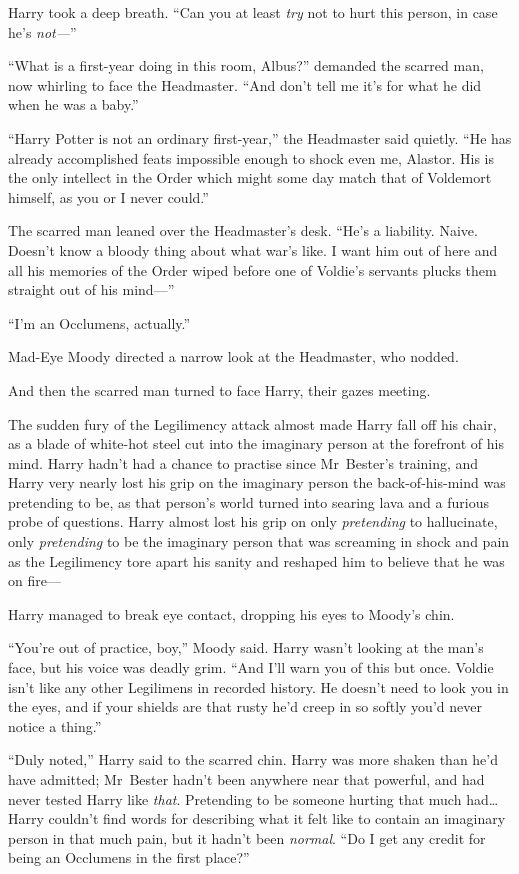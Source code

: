 Harry took a deep breath. “Can you at least \emph{try} not to hurt this person, in case he’s \emph{not—}”

“What is a first-year doing in this room, Albus?” demanded the scarred man, now whirling to face the Headmaster. “And don’t tell me it’s for what he did when he was a baby.”

“Harry Potter is not an ordinary first-year,” the Headmaster said quietly. “He has already accomplished feats impossible enough to shock even me, Alastor. His is the only intellect in the Order which might some day match that of Voldemort himself, as you or I never could.”

The scarred man leaned over the Headmaster’s desk. “He’s a liability. Naive. Doesn’t know a bloody thing about what war’s like. I want him out of here and all his memories of the Order wiped before one of Voldie’s servants plucks them straight out of his mind—”

“I’m an Occlumens, actually.”

Mad-Eye Moody directed a narrow look at the Headmaster, who nodded.

And then the scarred man turned to face Harry, their gazes meeting.

The sudden fury of the Legilimency attack almost made Harry fall off his chair, as a blade of white-hot steel cut into the imaginary person at the forefront of his mind. Harry hadn’t had a chance to practise since Mr~Bester’s training, and Harry very nearly lost his grip on the imaginary person the back-of-his-mind was pretending to be, as that person’s world turned into searing lava and a furious probe of questions. Harry almost lost his grip on only \emph{pretending} to hallucinate, only \emph{pretending} to be the imaginary person that was screaming in shock and pain as the Legilimency tore apart his sanity and reshaped him to believe that he was on fire—

Harry managed to break eye contact, dropping his eyes to Moody’s chin.

“You’re out of practice, boy,” Moody said. Harry wasn’t looking at the man’s face, but his voice was deadly grim. “And I’ll warn you of this but once. Voldie isn’t like any other Legilimens in recorded history. He doesn’t need to look you in the eyes, and if your shields are that rusty he’d creep in so softly you’d never notice a thing.”

“Duly noted,” Harry said to the scarred chin. Harry was more shaken than he’d have admitted; Mr~Bester hadn’t been anywhere near that powerful, and had never tested Harry like \emph{that}. Pretending to be someone hurting that much had…Harry couldn’t find words for describing what it felt like to contain an imaginary person in that much pain, but it hadn’t been \emph{normal}. “Do I get any credit for being an Occlumens in the first place?”

